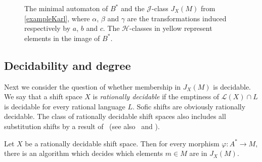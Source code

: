 \documentclass[a4paper,UKenglish,numberwithinsect,cleveref]{lipics-v2021}
\newcommand{\drawgrid}[3]{
            \foreach \i in {2,...,#1}
                \draw (#3-\i-1.north west) to (#3-\i-#1.north east);
            \foreach \i in {2,...,#2}
                \draw (#3-1-\i.north west) to (#3-#2-\i.south west);
            }
\newcommand{\HH}{\mathrel{\mathscr{H}}}
\newcommand{\JJ}{\mathrel{\mathscr{J}}}
\newcommand{\cL}{\mathcal L}
\begin{document}
\begin{example}
\begin{figure}
        \qquad
        \caption{The minimal automaton of $B^*$ and the $\JJ$-class $J_X(M)$ from \cref{exampleKarl}, where $\alpha$, $\beta$ and $\gamma$ are the transformations induced respectively by $a$, $b$ and $c$. The $\HH$-classes in yellow represent elements in the image of $B^*$.}\label{figureExampleKarl}
    \end{figure}
 \end{example}
 
\subsection{Decidability and degree}

Next we consider the question of whether membership in $J_X(M)$ is decidable. We say that a shift space $X$ is \emph{rationally decidable} if the emptiness of $\cL(X)\cap L$ is decidable for every rational language $L$. Sofic shifts are obviously rationally decidable. The class of rationally decidable shift spaces also includes all substitution shifts by a result of~\cite[Lemma 3]{Salo2017} (see also~\cite[Lemma 3.15]{BealPerrinRestivo2024a} and \cite{carton02}).
\begin{proposition} \label{prop:decidable}
    Let $X$ be a rationally decidable shift space. Then for every morphism $\varphi\colon A^*\to M$, there is an algorithm which decides which elements $m\in M$ are in $J_X(M)$.
\end{proposition}
\end{document}
